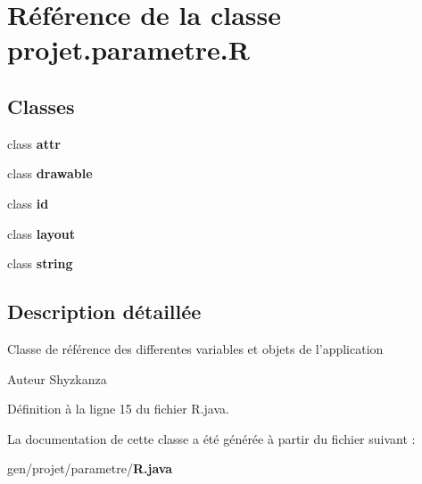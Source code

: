 \section{\-Référence de la classe projet.\-parametre.\-R}
\label{classprojet_1_1parametre_1_1_r}
\subsection*{\-Classes}
\begin{DoxyCompactItemize}
\item 
class {\bf attr}
\item 
class {\bf drawable}
\item 
class {\bf id}
\item 
class {\bf layout}
\item 
class {\bf string}
\end{DoxyCompactItemize}


\subsection{\-Description détaillée}
\-Classe de référence des differentes variables et objets de l'application

\begin{DoxyAuthor}{\-Auteur}
\-Shyzkanza 
\end{DoxyAuthor}


\-Définition à la ligne 15 du fichier \-R.\-java.



\-La documentation de cette classe a été générée à partir du fichier suivant \-:\begin{DoxyCompactItemize}
\item 
gen/projet/parametre/{\bf \-R.\-java}\end{DoxyCompactItemize}
